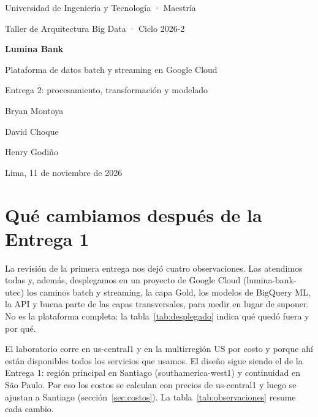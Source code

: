 \documentclass[11pt,a4paper]{article}
\DeclareRobustCommand{\cod}[1]{{\small\ttfamily\codbreaks #1}}
\DeclareRobustCommand{\codbreaks}{\let\oldus\_\renewcommand{\_}{\oldus\allowbreak}}
\begin{document}
\begin{titlepage}
\centering
\vspace*{2.2cm}
{\sffamily\color{gris}\large Universidad de Ingeniería y Tecnología · Maestría\par}
{\sffamily\color{gris}Taller de Arquitectura Big Data · Ciclo 2026-2\par}
\vspace{2.4cm}
{\sffamily\bfseries\color{marino}\fontsize{30}{36}\selectfont Lumina Bank\par}
\vspace{0.4cm}
{\sffamily\color{marino}\Large Plataforma de datos batch y streaming en Google Cloud\par}
\vspace{0.3cm}
{\sffamily\color{verdeazul}\large Entrega 2: procesamiento, transformación y modelado\par}
\vspace{2.6cm}
{\large Bryan Montoya\par David Choque\par Henry Godiño\par}
\vfill
{\color{gris}Lima, 11 de noviembre de 2026\par}
\end{titlepage}

\tableofcontents
\newpage

\section{Qué cambiamos después de la Entrega 1}

La revisión de la primera entrega nos dejó cuatro observaciones. Las atendimos todas y, además, desplegamos en un proyecto de Google Cloud (\cod{lumina-bank-utec}) los caminos batch y streaming, la capa Gold, los modelos de BigQuery ML, la API y buena parte de las capas transversales, para medir en lugar de suponer. No es la plataforma completa: la tabla~\ref{tab:desplegado} indica qué quedó fuera y por qué.

El laboratorio corre en \cod{us-central1} y en la multirregión US por costo y porque ahí están disponibles todos los servicios que usamos. El diseño sigue siendo el de la Entrega 1: región principal en Santiago (\cod{southamerica-west1}) y continuidad en São Paulo. Por eso los costos se calculan con precios de \cod{us-central1} y luego se ajustan a Santiago (sección~\ref{sec:costos}). La tabla~\ref{tab:observaciones} resume cada cambio.
\end{document}
